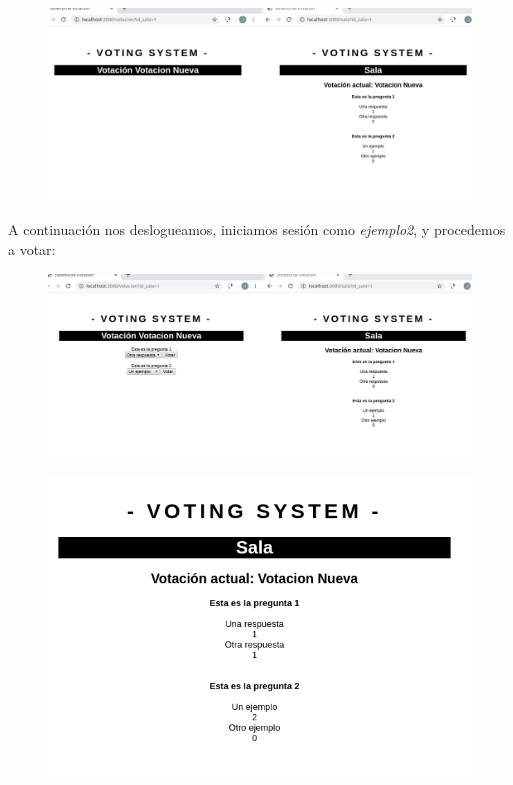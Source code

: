 \documentclass{article}
\begin{document}
 	\begin{figure}[H]
 		\centering
 		\includegraphics[totalheight=6.34cm]{img/cap15}
 		\caption{}
 	\end{figure}
 
 	A continuación nos deslogueamos, iniciamos sesión como \textit{ejemplo2}, y procedemos a votar: \\
 
 	\begin{figure}[H]
 		\centering
 		\includegraphics[totalheight=6cm]{img/cap16}
 		\caption{}
 	\end{figure}
 
 
 	\begin{figure}[H]
 		\centering
 		\includegraphics[totalheight=7.2cm]{img/cap17}
 		\caption{}
 	\end{figure}
 
\end{document}
